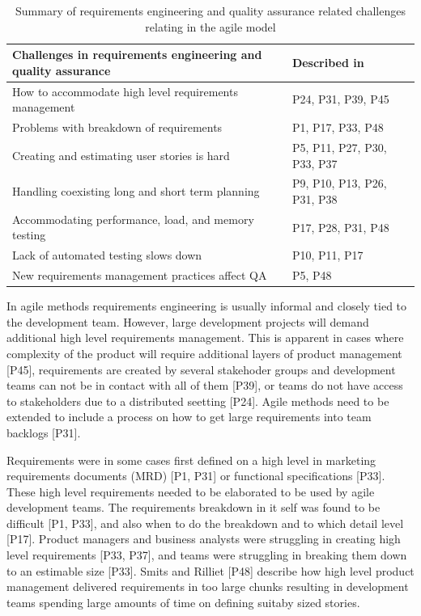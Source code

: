 \documentclass[preprint,authoryear,12pt]{elsarticle}
\begin{document}
\begin{table}[t]
    \centering
    \begin{tabular}{ >{\raggedright\arraybackslash}p{}
                     >{\raggedright\arraybackslash}p{} }
        \toprule
        Challenges in requirements engineering and quality assurance  &  Described in \\
        \midrule
        How to accommodate high level requirements management  &  P24, P31, P39, P45  \\
        Problems with breakdown of requirements        &  P1, P17, P33, P48  \\
        Creating and estimating user stories is hard   &  P5, P11, P27, P30, P33, P37 \\
        Handling coexisting long and short term planning  &  P9, P10, P13, P26, P31, P38 \\
        Accommodating performance, load, and memory testing  &  P17, P28, P31, P48 \\
        Lack of automated testing slows down           &  P10, P11, P17 \\
        New requirements management practices affect QA  &  P5, P48 \\
        \bottomrule
    \end{tabular}
    \caption{Summary of requirements engineering and quality assurance related
             challenges relating in the agile model}
    \label{table:challenges_requirementsandqa}
\end{table}


In agile methods requirements engineering is usually informal and closely tied
to the development team. However, large development projects will demand
additional high level requirements management. This is apparent in cases where
complexity of the product will require additional layers of product management
[P45], requirements are created by several stakehoder groups and development
teams can not be in contact with all of them [P39], or teams do not have access
to stakeholders due to a distributed seetting [P24]. Agile methods need to be
extended to include a process on how to get large requirements into team
backlogs [P31].

Requirements were in some cases first defined on a high level in marketing
requirements documents (MRD) [P1, P31] or functional specifications [P33].
These high level requirements needed to be elaborated to be used by agile
development teams. The requirements breakdown in it self was found to be
difficult [P1, P33], and also when to do the breakdown and to which detail level
[P17].
Product managers and business analysts were struggling in creating high level
requirements [P33, P37], and teams were struggling in breaking them down to an
estimable size [P33]. Smits and Rilliet [P48] describe how high level product
management delivered requirements in too large chunks resulting in development
teams spending large amounts of time on defining suitaby sized stories.
\end{document}
